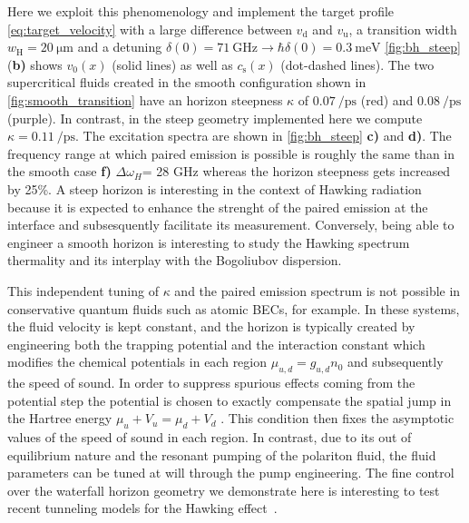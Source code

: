 Here we exploit this phenomenology and implement the target profile \autoref{eq:target_velocity} with a large difference between $v_\mathrm{d}$ and $v_\mathrm{u}$, a transition width $w_\mathrm{H}=\SI{20}{\micro\meter}$ and a detuning $\delta(0)=\SI{71}{\giga\hertz} \rightarrow\hbar\delta(0)=\SI{0.3}{\milli \electronvolt}$
\autoref{fig:bh_steep} (\textbf{b)} shows $v_0(x)$ (solid lines) as well as $c_\mathrm{s}(x)$ (dot-dashed lines). The two supercritical fluids created in the smooth configuration shown in \autoref{fig:smooth_transition}
have an horizon steepness $\kappa$ of $\SI{0.07}{\per \pico \second}$ (red) and $\SI{0.08}{\per \pico \second}$ (purple). In contrast, in the steep geometry implemented here we compute $\kappa = \SI{0.11}{\per \pico \second}$. The excitation spectra are shown in \autoref{fig:bh_steep} \textbf{c)} and \textbf{d)}.
The frequency range at which paired emission is possible is roughly the same than in the smooth case \textbf{f)} $\Delta \omega_H$= 28 GHz whereas the horizon steepness 
gets increased by 25\%. A steep horizon is interesting in the context of Hawking radiation because it is expected to enhance the strenght of the paired emission \cite{Recati_acousticHR_2009} at the interface and subsesquently facilitate its measurement. 
Conversely, being able to engineer a smooth horizon is interesting to study the Hawking spectrum thermality \cite{fabbri_steplike_2011} and its interplay with the Bogoliubov dispersion.


This independent tuning of $\kappa$ and the paired emission spectrum is not possible in conservative quantum fluids such as atomic BECs, for example. In these systems, the fluid velocity is kept constant, and the horizon is typically created by engineering 
both the trapping potential and the interaction constant which modifies the chemical potentials in each region $\mu _{u,d}=g_{u,d}n_0$ and subsequently the speed of sound. In order to suppress spurious effects coming from the potential step 
the potential is chosen to exactly compensate the spatial jump in the Hartree energy $\mu_u+ V_u=\mu_d+V_d$ \cite{Recati_acousticHR_2009}. This condition then fixes the asymptotic values of the speed of sound in each region.
In contrast, due to its out of equilibrium nature and the resonant pumping of the polariton fluid, the fluid parameters can be tuned at will through the pump engineering.
The fine control over the waterfall horizon geometry we demonstrate here is interesting to test recent tunneling models for the Hawking effect~\cite{delporro2024tunneling}.




